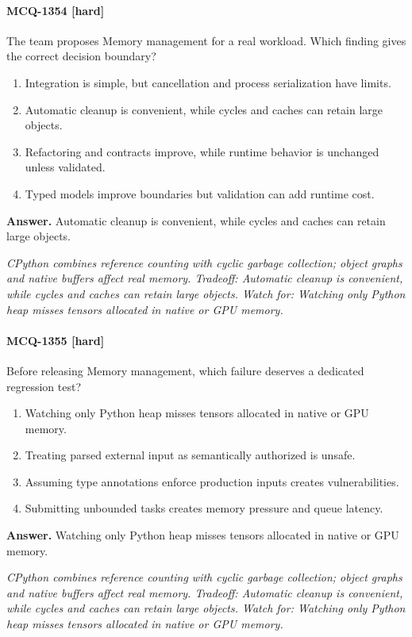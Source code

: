 \paragraph{MCQ-1354 [hard]} The team proposes Memory management for a real workload. Which finding gives the correct decision boundary?
\begin{enumerate}[label=\Alph*.]
\item Integration is simple, but cancellation and process serialization have limits.
\item Automatic cleanup is convenient, while cycles and caches can retain large objects.
\item Refactoring and contracts improve, while runtime behavior is unchanged unless validated.
\item Typed models improve boundaries but validation can add runtime cost.
\end{enumerate}
\noindent\textbf{Answer.} Automatic cleanup is convenient, while cycles and caches can retain large objects.
\par\textit{CPython combines reference counting with cyclic garbage collection; object graphs and native buffers affect real memory. Tradeoff: Automatic cleanup is convenient, while cycles and caches can retain large objects. Watch for: Watching only Python heap misses tensors allocated in native or GPU memory.}
\paragraph{MCQ-1355 [hard]} Before releasing Memory management, which failure deserves a dedicated regression test?
\begin{enumerate}[label=\Alph*.]
\item Watching only Python heap misses tensors allocated in native or GPU memory.
\item Treating parsed external input as semantically authorized is unsafe.
\item Assuming type annotations enforce production inputs creates vulnerabilities.
\item Submitting unbounded tasks creates memory pressure and queue latency.
\end{enumerate}
\noindent\textbf{Answer.} Watching only Python heap misses tensors allocated in native or GPU memory.
\par\textit{CPython combines reference counting with cyclic garbage collection; object graphs and native buffers affect real memory. Tradeoff: Automatic cleanup is convenient, while cycles and caches can retain large objects. Watch for: Watching only Python heap misses tensors allocated in native or GPU memory.}
